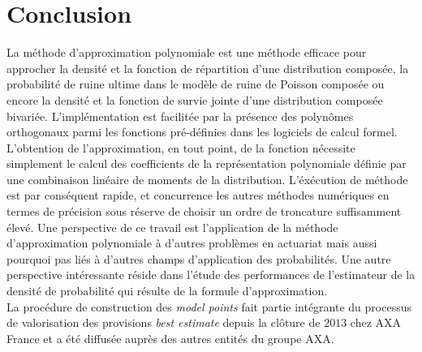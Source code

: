 \chapter*{Conclusion}
 




La méthode d\rq{}approximation polynomiale est une méthode efficace pour approcher la densité et la fonction de répartition d\rq{}une distribution composée, la probabilité de ruine ultime dans le modèle de ruine de Poisson composée ou encore la densité et la fonction de survie jointe d\rq{}une distribution composée bivariée. L\rq{}implémentation est facilitée par la présence des polynômes orthogonaux parmi les fonctions pré-définies dans les logiciels de calcul formel. L\rq{}obtention de l\rq{}approximation, en tout point, de la fonction nécessite simplement le calcul des coefficients de la représentation polynomiale définie par une combinaison linéaire de moments de la distribution. L\rq{}éxécution de méthode est par conséquent rapide, et concurrence les autres méthodes numériques en termes de précision sous réserve de choisir un ordre de troncature suffisamment élevé. Une perspective de ce travail est l\rq{}application de la méthode d\rq{}approximation polynomiale à d\rq{}autres problèmes en actuariat mais aussi pourquoi pas liés à d\rq{}autres champs d\rq{}application des probabilités. Une autre perspective intéressante réside dans l\rq{}étude des performances de l\rq{}estimateur de la densité de probabilité qui résulte de la formule d\rq{}approximation.\\

La procédure de construction des \textit{model points} fait partie intégrante du processus de valorisation des provisions \textit{best estimate} depuis la clôture de $2013$ chez AXA France et a été diffusée auprès des autres entités du groupe AXA. 
\clearpage


